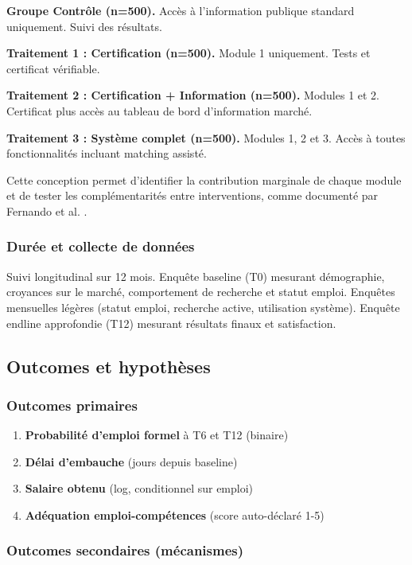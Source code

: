 \documentclass[12pt,a4paper]{article}
\begin{document}
\textbf{Groupe Contrôle (n=500).} Accès à l'information publique standard uniquement. Suivi des résultats.

\textbf{Traitement 1 : Certification (n=500).} Module 1 uniquement. Tests et certificat vérifiable.

\textbf{Traitement 2 : Certification + Information (n=500).} Modules 1 et 2. Certificat plus accès au tableau de bord d'information marché.

\textbf{Traitement 3 : Système complet (n=500).} Modules 1, 2 et 3. Accès à toutes fonctionnalités incluant matching assisté.

Cette conception permet d'identifier la contribution marginale de chaque module et de tester les complémentarités entre interventions, comme documenté par Fernando et al. \citeyearpar{fernando2023}.

\subsubsection{Durée et collecte de données}

Suivi longitudinal sur 12 mois. Enquête baseline (T0) mesurant démographie, croyances sur le marché, comportement de recherche et statut emploi. Enquêtes mensuelles légères (statut emploi, recherche active, utilisation système). Enquête endline approfondie (T12) mesurant résultats finaux et satisfaction.

\subsection{Outcomes et hypothèses}

\subsubsection{Outcomes primaires}

\begin{enumerate}
    \item \textbf{Probabilité d'emploi formel} à T6 et T12 (binaire)
    \item \textbf{Délai d'embauche} (jours depuis baseline)
    \item \textbf{Salaire obtenu} (log, conditionnel sur emploi)
    \item \textbf{Adéquation emploi-compétences} (score auto-déclaré 1-5)
\end{enumerate}

\subsubsection{Outcomes secondaires (mécanismes)}
\end{document}
